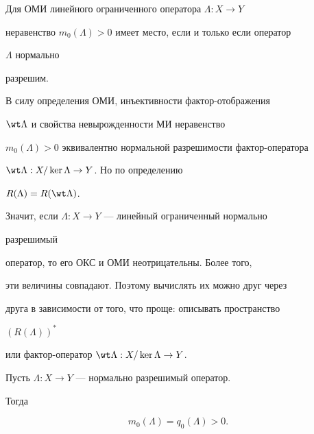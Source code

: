  


\begin{thm} Для ОМИ линейного ограниченного оператора $\Lambda:X\to Y$ 


неравенство $m_0(\Lambda)>0$ имеет место, если и только если оператор 


$\Lambda$ нормально 


разрешим. 


\end{thm} 


 


\begin{pf} В силу определения ОМИ, инъективности фактор-отображения 


$\wt\Lambda$ и свойства невырожденности МИ неравенство  


$m_0(\Lambda)>0$ эквивалентно нормальной разрешимости фактор-оператора 


$\wt\Lambda:X/\ker\Lambda\to Y$. Но по определению 


$R(\Lambda)=R(\wt\Lambda)$. 


\end{pf} 


 


Значит, если $\Lambda:X\to Y$ --- линейный ограниченный нормально 


разрешимый 


оператор, то его ОКС и ОМИ неотрицательны. Более того, 


эти величины совпадают. Поэтому вычислять их можно друг через 


друга в зависимости от того, что проще: описывать пространство 


$(R(\Lambda))^*$ 


или фактор-оператор $\wt\Lambda:X/\ker\Lambda\to Y$. 


 


\begin{thm} Пусть $\Lambda:X\to Y$ --- нормально разрешимый оператор. 


Тогда 


\begin{equation} 


m_0(\Lambda)=q_0(\Lambda)>0. 


\end{equation} 


\end{thm} 


